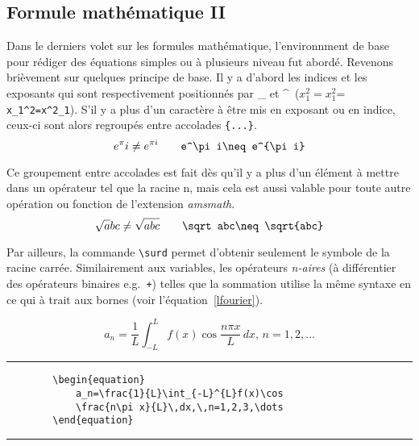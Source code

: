 \subsection*{Formule mathématique II}
Dans le derniers volet sur les formules mathématique, l'environnment de base pour rédiger des équations simples ou à plusieurs niveau fut abordé.  Revenons brièvement sur quelques principe de base. Il y a d'abord les indices et les exposants qui sont respectivement positionnés par \_ et \^~($x_1^2=x^2_1$= \verb|x_1^2=x^2_1|). S'il y a plus d'un caractère à être mis en exposant ou en indice, ceux-ci sont alors regroupés entre accolades \verb|{...}|.
%
\[e^\pi i\neq e^{\pi i}\qquad\verb|e^\pi i\neq e^{\pi i}|\]
%
\par Ce groupement entre accolades est fait dès qu'il y a plus d'un élément à mettre dans un opérateur tel que la racine n\ieme{}, mais cela est aussi valable pour toute autre opération ou fonction de l'extension \textit{amsmath}.
%
\[\sqrt abc\neq \sqrt{abc}\qquad\verb|\sqrt abc\neq \sqrt{abc}|\]
%
\par Par ailleurs, la commande \verb|\surd| permet d'obtenir seulement le symbole de la racine carrée. Similairement aux variables, les opérateurs \textit{n-aires} (à différentier des opérateurs binaires e.g.~\verb|+|) telles que la sommation utilise la même syntaxe en ce qui à trait aux bornes (voir l'équation~\ref{lfourier}).
%
\begin{table}[H]
	\centering
	\begin{equation}\label{lfourier}
		a_n=\frac{1}{L}\int_{-L}^{L}f(x)\cos
		\frac{n\pi x}{L}\,dx,\,n=1,2,\dots
	\end{equation}
	\hrule
	\begin{verbatim}
		\begin{equation}
			a_n=\frac{1}{L}\int_{-L}^{L}f(x)\cos
			\frac{n\pi x}{L}\,dx,\,n=1,2,3,\dots
		\end{equation}
	\end{verbatim}
	\hrule
\end{table}
%
